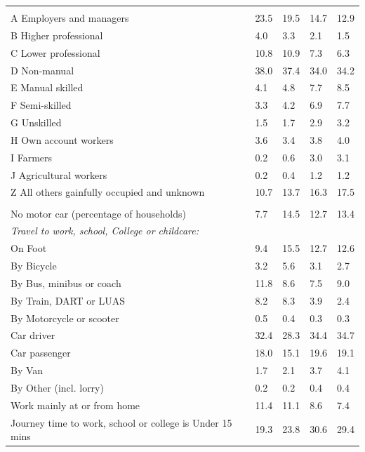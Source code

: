 \documentclass{article}
\begin{document}
\begin{table}[h]
\begin{tabular}{KTTTT}
\hline
    \\ 
    \hline
A Employers and managers & 23.5& 19.5& 14.7& 12.9\\
B Higher professional & 4.0& 3.3& 2.1& 1.5\\
C Lower professional & 10.8& 10.9&  7.3&  6.3\\
D Non-manual & 38.0& 37.4& 34.0& 34.2\\
E Manual skilled & 4.1& 4.8& 7.7& 8.5\\
F Semi-skilled & 3.3& 4.2& 6.9& 7.7\\
G Unskilled & 1.5& 1.7& 2.9& 3.2\\
H Own account workers & 3.6& 3.4& 3.8& 4.0\\
I Farmers & 0.2& 0.6& 3.0& 3.1\\
J Agricultural workers & 0.2& 0.4& 1.2& 1.2\\
Z All others gainfully occupied and unknown & 10.7& 13.7& 16.3& 17.5\\
\hline
{}\hline
    \\ 
    \hline
No motor car (percentage of households) &  7.7& 14.5& 12.7& 
13.4\\
    \hline 
\emph{Travel to work, school, College or childcare:} & & & \\
\quad On Foot &  9.4& 15.5& 12.7& 12.6\\ 
\quad By Bicycle & 3.2& 5.6& 3.1& 2.7\\ 
\quad By Bus, minibus or coach & 11.8&  8.6&  7.5&  9.0\\
\quad By Train, DART or LUAS & 8.2& 8.3& 3.9& 2.4\\
\quad By Motorcycle or scooter & 0.5& 0.4& 0.3& 0.3\\
\quad Car driver & 32.4 & 28.3& 34.4& 34.7\\
\quad Car passenger & 18.0& 15.1& 19.6& 19.1\\
\quad By Van & 1.7& 2.1& 3.7& 4.1\\
\quad By Other (incl. lorry) & 0.2& 0.2& 0.4& 0.4\\
    \hline
Work mainly at or from home & 11.4& 11.1&  8.6&  7.4\\
Journey time to work, school or college is Under 15 mins & 19.3& 23.8& 30.6& 29.4\\

\end{tabular}
\end{table}
\end{document}

